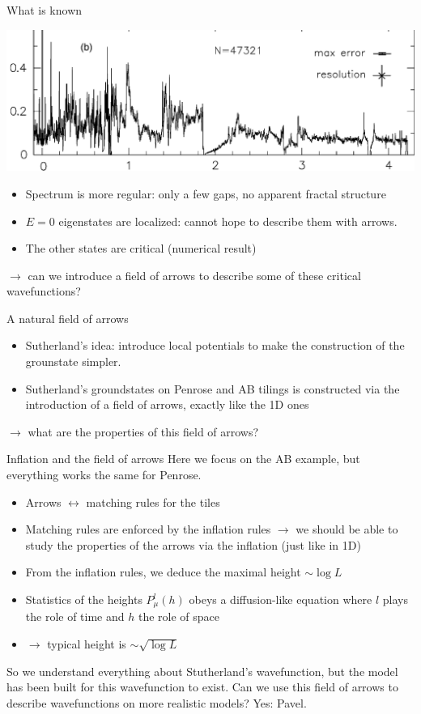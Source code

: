 \documentclass[xcolor=x11names,compress,professionalfonts]{beamer}
\renewcommand{\(}{\begin{columns}}
\renewcommand{\)}{\end{columns}}
\newcommand{\<}[1]{\begin{column}{#1}}
\renewcommand{\>}{\end{column}}
\begin{document}
\begin{frame}{What is known}

{\centering
\includegraphics[scale=.1]{img/idos_AB_small.png}

}
\begin{itemize}
	\item Spectrum is more regular: only a few gaps, no apparent fractal structure
	\item $E = 0$ eigenstates are localized: cannot hope to describe them with arrows.
	\item The other states are critical (numerical result)
\end{itemize}
$\rightarrow$ can we introduce a field of arrows to describe some of these critical wavefunctions?
\end{frame}

\begin{frame}{A natural field of arrows}
\begin{itemize}
	\item Sutherland's idea: introduce local potentials to make the construction of the grounstate simpler.
	\item Sutherland's groundstates on Penrose and AB tilings is constructed via the introduction of a field of arrows, exactly like the 1D ones
\end{itemize}
$\rightarrow$ what are the properties of this field of arrows?
\end{frame}

\begin{frame}{Inflation and the field of arrows}
Here we focus on the AB example, but everything works the same for Penrose.
\begin{itemize}
	\item Arrows $\leftrightarrow$ matching rules for the tiles 
	\item Matching rules are enforced by the inflation rules $\rightarrow$ we should be able to study the properties of the arrows via the inflation (just like in 1D)
	\item From the inflation rules, we deduce the maximal height $\sim \log L$
	\item Statistics of the heights $P_\mu^{l}(h)$ obeys a diffusion-like equation where $l$ plays the role of time and $h$ the role of space
	\item $\rightarrow$ typical height is $\sim \sqrt{\log L}$
\end{itemize}
So we understand everything about Stutherland's wavefunction, but the model has been built for this wavefunction to exist. 
Can we use this field of arrows to describe wavefunctions on more realistic models?
Yes: Pavel.
\end{frame}
\end{document}
